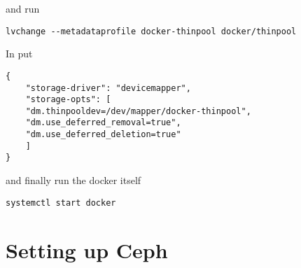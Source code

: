 and run

\begin{lstlisting}
lvchange --metadataprofile docker-thinpool docker/thinpool
\end{lstlisting}

In  put

\begin{lstlisting}
{
    "storage-driver": "devicemapper",
    "storage-opts": [
    "dm.thinpooldev=/dev/mapper/docker-thinpool",
    "dm.use_deferred_removal=true",
    "dm.use_deferred_deletion=true"
    ]
}
\end{lstlisting}

and finally run the docker itself

\begin{lstlisting}
systemctl start docker
\end{lstlisting}

\section{Setting up Ceph}
\label{sec:setup-ceph}




